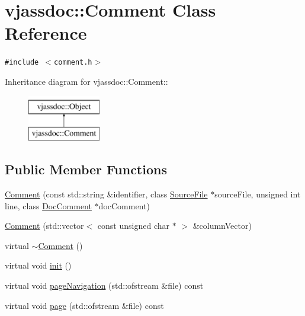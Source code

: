 \hypertarget{classvjassdoc_1_1Comment}{
\section{vjassdoc::Comment Class Reference}
\label{classvjassdoc_1_1Comment}
}
{\tt \#include $<$comment.h$>$}

Inheritance diagram for vjassdoc::Comment::\begin{figure}[H]
\begin{center}
\leavevmode
\includegraphics[height=2cm]{classvjassdoc_1_1Comment}
\end{center}
\end{figure}
\subsection*{Public Member Functions}
\begin{CompactItemize}
\item 
\hyperlink{classvjassdoc_1_1Comment_5f0e466f9d476c67442ada31ea51840e}{Comment} (const std::string \&identifier, class \hyperlink{classvjassdoc_1_1SourceFile}{SourceFile} $\ast$sourceFile, unsigned int line, class \hyperlink{classvjassdoc_1_1DocComment}{DocComment} $\ast$docComment)
\item 
\hyperlink{classvjassdoc_1_1Comment_ba8561a5b6e39538356e21e7edf93432}{Comment} (std::vector$<$ const unsigned char $\ast$ $>$ \&columnVector)
\item 
virtual \hyperlink{classvjassdoc_1_1Comment_97211d4a9d951c8eed8061c5e7a518b8}{$\sim$Comment} ()
\item 
virtual void \hyperlink{classvjassdoc_1_1Comment_07ad51bf42ce397832b77eb96379c054}{init} ()
\item 
virtual void \hyperlink{classvjassdoc_1_1Comment_4bcb5f83071ad7954b922fdaf8e0ea8e}{pageNavigation} (std::ofstream \&file) const 
\item 
virtual void \hyperlink{classvjassdoc_1_1Comment_d7b59c02557b961deb2f470b180bab7a}{page} (std::ofstream \&file) const 
\end{CompactItemize}


